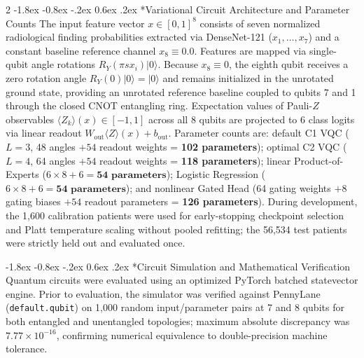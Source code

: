 \documentclass[10pt,a4paper,twoside]{article}
\makeatletter
\renewcommand{\subsection}{\@startsection{subsection}{2}{\z@}%
  {-1.8ex \@plus -0.8ex \@minus -.2ex}%
  {0.6ex \@plus.2ex}%
  {\normalfont\normalsize\sffamily\bfseries\color{naturedark}}}
\makeatother
\begin{document}
\begin{multicols}{2}
\subsection*{Variational Circuit Architecture and Parameter Counts}
The input feature vector $x \in [0, 1]^8$ consists of seven normalized radiological finding probabilities extracted via DenseNet-121 ($x_1, \dots, x_7$) and a constant baseline reference channel $x_8 \equiv 0.0$. Features are mapped via single-qubit angle rotations $R_Y(\pi s x_i)|0\rangle$. Because $x_8 \equiv 0$, the eighth qubit receives a zero rotation angle $R_Y(0)|0\rangle = |0\rangle$ and remains initialized in the unrotated ground state, providing an unrotated reference baseline coupled to qubits 7 and 1 through the closed CNOT entangling ring. Expectation values of Pauli-$Z$ observables $\langle Z_k \rangle(x) \in [-1, 1]$ across all 8 qubits are projected to 6 class logits via linear readout $W_{\text{out}} \langle Z \rangle(x) + b_{\text{out}}$. Parameter counts are: default C1 VQC ($L=3$, 48 angles $+ 54$ readout weights = \textbf{102 parameters}); optimal C2 VQC ($L=4$, 64 angles $+ 54$ readout weights = \textbf{118 parameters}); linear Product-of-Experts ($6 \times 8 + 6 = \mathbf{54\text{ parameters}}$); Logistic Regression ($6 \times 8 + 6 = \mathbf{54\text{ parameters}}$); and nonlinear Gated Head (64 gating weights $+ 8$ gating biases $+ 54$ readout parameters = \textbf{126 parameters}). During development, the 1,600 calibration patients were used for early-stopping checkpoint selection and Platt temperature scaling \cite{platt1999} without pooled refitting; the 56,534 test patients were strictly held out and evaluated once.

\subsection*{Circuit Simulation and Mathematical Verification}
Quantum circuits were evaluated using an optimized PyTorch batched statevector engine. Prior to evaluation, the simulator was verified against PennyLane (\texttt{default.qubit}) on 1,000 random input/parameter pairs at 7 and 8 qubits for both entangled and unentangled topologies; maximum absolute discrepancy was $7.77 \times 10^{-16}$, confirming numerical equivalence to double-precision machine tolerance.


\end{multicols}
\end{document}
